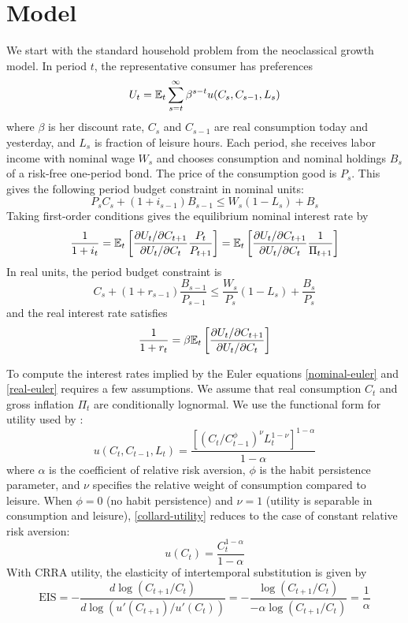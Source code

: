 \section{Model}
We start with the standard household problem from the neoclassical growth model. In period $t$, the representative consumer has preferences $$U_t = \mathbb{E}_t \sum_{s=t}^\infty \beta^{s-t} u(C_s, C_{s-1}, L_s)$$ where $\beta$ is her discount rate, $C_s$ and $C_{s-1}$ are real consumption today and yesterday, and $L_s$ is fraction of leisure hours. Each period, she receives labor income with nominal wage $W_s$ and chooses consumption and nominal holdings $B_s$ of a risk-free one-period bond. The price of the consumption good is $P_s$. This gives the following period budget constraint in nominal units: $$P_s C_s + (1 + i_{s-1})B_{s-1} \leq W_s(1 - L_s) + B_s$$
Taking first-order conditions gives the equilibrium nominal interest rate by
\begin{equation}
\label{nominal-euler}
\frac{1}{1 + i_t} = \mathbb{E}_t \left[  \frac{\partial U_t / \partial C_{t+1}}{\partial U_t / \partial C_t} \frac{P_t}{P_{t+1}}  \right] = \mathbb{E}_t \left[  \frac{\partial U_t / \partial C_{t+1}}{\partial U_t / \partial C_t} \frac{1}{\Pi_{t+1}}  \right]
\end{equation}
In real units, the period budget constraint is $$C_s + (1 + r_{s-1}) \frac{B_{s-1}}{P_{s-1}} \leq \frac{W_s}{P_s}(1 - L_s) + \frac{B_s}{P_s}$$ and the real interest rate satisfies
\begin{equation}
\label{real-euler}
\frac{1}{1 + r_t} = \beta \mathbb{E}_t \left[  \frac{\partial U_t / \partial C_{t+1}}{\partial U_t / \partial C_t}  \right]
\end{equation}

To compute the interest rates implied by the Euler equations \eqref{nominal-euler} and \eqref{real-euler} requires a few assumptions. We assume that real consumption $C_t$ and gross inflation $\Pi_t$ are conditionally lognormal. We use the functional form for utility used by \cite{collard11}:
\begin{equation}
\label{collard-utility}
u(C_t, C_{t-1}, L_t) = \frac{[(C_t/C_{t-1}^\phi)^\nu L_t^{1-\nu}]^{1-\alpha}}{1-\alpha}
\end{equation}
where $\alpha$ is the coefficient of relative risk aversion, $\phi$ is the habit persistence parameter, and $\nu$ specifies the relative weight of consumption compared to leisure. When $\phi = 0$ (no habit persistence) and $\nu = 1$ (utility is separable in consumption and leisure), \eqref{collard-utility} reduces to the case of constant relative risk aversion:
\begin{equation}
\label{crra-utility}
u(C_t) = \frac{C_t^{1-\alpha}}{1-\alpha}
\end{equation}
With CRRA utility, the elasticity of intertemporal substitution is given by $$\mathrm{EIS} = -\frac{d \log(C_{t+1}/C_t)}{d \log (u'(C_{t+1})/u'(C_t))} = -\frac{\log(C_{t+1}/C_t)}{-\alpha \log(C_{t+1}/C_t)} = \frac{1}{\alpha}$$

